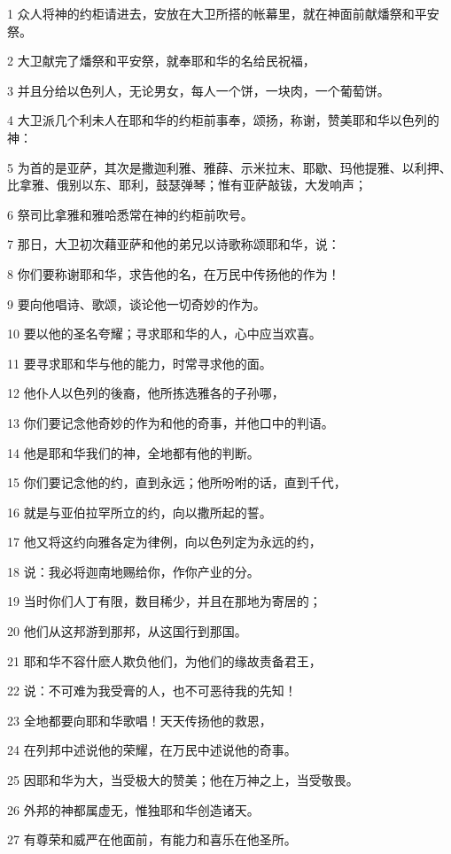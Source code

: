 \par 1 众人将神的约柜请进去，安放在大卫所搭的帐幕里，就在神面前献燔祭和平安祭。
\par 2 大卫献完了燔祭和平安祭，就奉耶和华的名给民祝福，
\par 3 并且分给以色列人，无论男女，每人一个饼，一块肉，一个葡萄饼。
\par 4 大卫派几个利未人在耶和华的约柜前事奉，颂扬，称谢，赞美耶和华以色列的神：
\par 5 为首的是亚萨，其次是撒迦利雅、雅薛、示米拉末、耶歇、玛他提雅、以利押、比拿雅、俄别以东、耶利，鼓瑟弹琴；惟有亚萨敲钹，大发响声；
\par 6 祭司比拿雅和雅哈悉常在神的约柜前吹号。
\par 7 那日，大卫初次藉亚萨和他的弟兄以诗歌称颂耶和华，说：
\par 8 你们要称谢耶和华，求告他的名，在万民中传扬他的作为！
\par 9 要向他唱诗、歌颂，谈论他一切奇妙的作为。
\par 10 要以他的圣名夸耀；寻求耶和华的人，心中应当欢喜。
\par 11 要寻求耶和华与他的能力，时常寻求他的面。
\par 12 他仆人以色列的後裔，他所拣选雅各的子孙哪，
\par 13 你们要记念他奇妙的作为和他的奇事，并他口中的判语。
\par 14 他是耶和华我们的神，全地都有他的判断。
\par 15 你们要记念他的约，直到永远；他所吩咐的话，直到千代，
\par 16 就是与亚伯拉罕所立的约，向以撒所起的誓。
\par 17 他又将这约向雅各定为律例，向以色列定为永远的约，
\par 18 说：我必将迦南地赐给你，作你产业的分。
\par 19 当时你们人丁有限，数目稀少，并且在那地为寄居的；
\par 20 他们从这邦游到那邦，从这国行到那国。
\par 21 耶和华不容什麽人欺负他们，为他们的缘故责备君王，
\par 22 说：不可难为我受膏的人，也不可恶待我的先知！
\par 23 全地都要向耶和华歌唱！天天传扬他的救恩，
\par 24 在列邦中述说他的荣耀，在万民中述说他的奇事。
\par 25 因耶和华为大，当受极大的赞美；他在万神之上，当受敬畏。
\par 26 外邦的神都属虚无，惟独耶和华创造诸天。
\par 27 有尊荣和威严在他面前，有能力和喜乐在他圣所。
